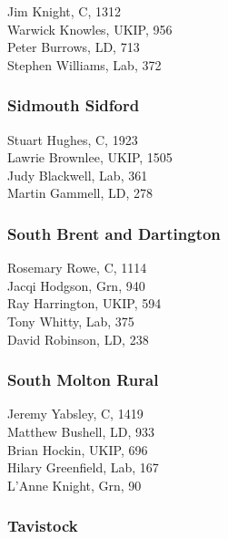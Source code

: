 \documentclass[a4paper,openany,10pt]{book}
\begin{document}


Jim Knight, C, 1312\\
Warwick Knowles, UKIP, 956\\
Peter Burrows, LD, 713\\
Stephen Williams, Lab, 372\\


\subsubsection*{Sidmouth Sidford}



Stuart Hughes, C, 1923\\
Lawrie Brownlee, UKIP, 1505\\
Judy Blackwell, Lab, 361\\
Martin Gammell, LD, 278\\


\subsubsection*{South Brent and Dartington}



Rosemary Rowe, C, 1114\\
Jacqi Hodgson, Grn, 940\\
Ray Harrington, UKIP, 594\\
Tony Whitty, Lab, 375\\
David Robinson, LD, 238\\


\subsubsection*{South Molton Rural}



Jeremy Yabsley, C, 1419\\
Matthew Bushell, LD, 933\\
Brian Hockin, UKIP, 696\\
Hilary Greenfield, Lab, 167\\
L'Anne Knight, Grn, 90\\


\subsubsection*{Tavistock}
\end{document}
